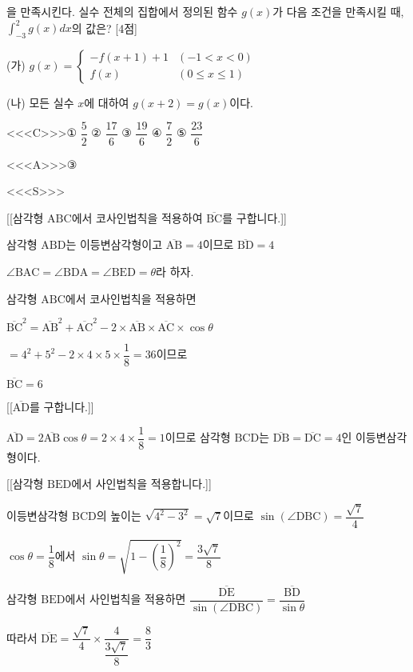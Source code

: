 \documentclass{oblivoir}
\begin{document}
을 만족시킨다. 실수 전체의 집합에서 정의된 함수 $g(x)$가 다음 조건을 만족시킬 때, $\displaystyle\int_{-3}^{2}g(x)dx$의 값은? [4점]

(가) $g(x)=\begin{cases}
-f(x+1)+1&(-1< x< 0)\\
f(x)&(0\le x\le 1)
\end{cases}$

(나) 모든 실수 $x$에 대하여 $g(x+2)=g(x)$이다.

<<<C>>>① $\dfrac{5}{2}$ ② $\dfrac{17}{6}$ ③ $\dfrac{19}{6}$ ④ $\dfrac{7}{2}$ ⑤ $\dfrac{23}{6}$

<<<A>>>③

<<<S>>>

[[삼각형 $\mathrm{ABC}$에서 코사인법칙을 적용하여 $\overline{\mathrm{BC}}$를 구합니다.]]

삼각형 $\mathrm{ABD}$는 이등변삼각형이고 $\overline{\mathrm{AB}}=4$이므로 $\overline{\mathrm{BD}}=4$

$\angle\mathrm{BAC}=\angle\mathrm{BDA}=\angle\mathrm{BED}=\theta$라 하자.

삼각형 $\mathrm{ABC}$에서 코사인법칙을 적용하면

$\overline{\mathrm{BC}}^{2}$$=\overline{\mathrm{AB}}^{2}+\overline{\mathrm{AC}}^{2}-2\times\overline{\mathrm{AB}}\times\overline{\mathrm{AC}}\times\cos\theta$

$=4^{2}+5^{2}-2\times 4\times 5\times\dfrac{1}{8}$$=36$이므로

$\overline{\mathrm{BC}}=6$

[[$\overline{\mathrm{AD}}$를 구합니다.]]

$\overline{\mathrm{AD}}=2\overline{\mathrm{AB}}\cos\theta =2\times 4\times\dfrac{1}{8}= 1$이므로 삼각형 $\mathrm{BCD}$는 $\overline{\mathrm{DB}}=\overline{\mathrm{DC}}=4$인 이등변삼각형이다.

[[삼각형 $\mathrm{BED}$에서 사인법칙을 적용합니다.]]

이등변삼각형 $\mathrm{BCD}$의 높이는 $\sqrt{4^{2}-3^{2}}=\sqrt{7}$이므로 $\sin(\angle\mathrm{DBC})=\dfrac{\sqrt{7}}{4}$

$\cos\theta =\dfrac{1}{8}$에서 $\sin\theta =\sqrt{1-\left(\dfrac{1}{8}\right)^{2}}=\dfrac{3\sqrt{7}}{8}$

삼각형 $\mathrm{BED}$에서 사인법칙을 적용하면 $\dfrac{\overline{\mathrm{DE}}}{\sin(\angle\mathrm{DBC})}=\dfrac{\overline{\mathrm{BD}}}{\sin\theta}$

따라서 $\overline{\mathrm{DE}}=\dfrac{\sqrt{7}}{4}\times\dfrac{4}{\dfrac{3\sqrt{7}}{8}}=\dfrac{8}{3}$
\end{document}

